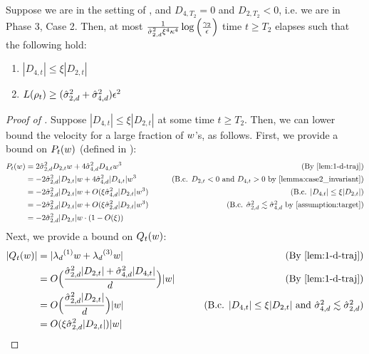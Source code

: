 \begin{lemma} \label{lemma:phase3_case2_d4_small_time}
Suppose we are in the setting of , and $D_{4, T_2} = 0$ and $D_{2, T_2} < 0$, i.e. we are in Phase 3, Case 2. Then, at most $\frac{1}{\hat{\sigma}_{2, d}^2 \xi^4 \kappa^4} \log\Big(\frac{\gamma_2}{\epsilon}\Big)$ time $t \geq T_2$ elapses such that the following hold:
\begin{enumerate}
    \item $|D_{4, t}| \leq \xi |D_{2, t}|$
    \item $L(\rho_t) \geq (\hat{\sigma}_{2, d}^2 + \hat{\sigma}_{4, d}^2) \epsilon^2$
\end{enumerate}
\end{lemma}
\begin{proof}[Proof of ]
Suppose $|D_{4, t}| \leq \xi |D_{2, t}|$ at some time $t \geq T_2$. Then, we can lower bound the velocity for a large fraction of $w$'s, as follows. First, we provide a bound on $P_t(w)$ (defined in ):
\begin{align}
P_t(\w)
& = 2 \sigmaCoeffTwo^2 D_{2, t} \w + 4 \sigmaCoeffFour^2 D_{4, t} \w^3 
& \tag{By \Cref{lem:1-d-traj}} \\
& = -2 \sigmaCoeffTwo^2 |D_{2, t}| \w + 4 \sigmaCoeffFour^2 |D_{4, t}| \w^3 
& \tag{B.c. $D_{2, t} < 0$ and $D_{4, t} > 0$ by \Cref{lemma:case2_invariant}} \\
& = -2 \sigmaCoeffTwo^2 |D_{2, t}| \w + O(\xi \sigmaCoeffFour^2 |D_{2, t}| \w^3) 
& \tag{B.c. $|D_{4, t}| \leq \xi |D_{2, t}|$} \\
& = -2 \sigmaCoeffTwo^2 |D_{2, t}| \w + O(\xi \sigmaCoeffTwo^2 |D_{2, t}| \w^3) 
& \tag{B.c. $\sigmaCoeffTwo^2 \lesssim \sigmaCoeffFour^2$ by \Cref{assumption:target}} \\
& = -2 \sigmaCoeffTwo^2 |D_{2, t}| \w \cdot (1 - O(\xi))
\end{align}
Next, we provide a bound on $Q_t(w)$:
\begin{align}
|Q_t(\w)|
& = |\lambdaD^{(1)} \w + \lambdaD^{(3)} \w|
& \tag{By \Cref{lem:1-d-traj}} \\
& = O\Big(\frac{\sigmaCoeffTwo^2 |D_{2, t}| + \sigmaCoeffFour^2 |D_{4, t}|}{d}\Big) |\w|
& \tag{By \Cref{lem:1-d-traj}} \\
& = O\Big(\frac{\sigmaCoeffTwo^2 |D_{2, t}|}{d}\Big) |\w| 
& \tag{B.c. $|D_{4, t}| \leq \xi |D_{2, t}|$ and $\sigmaCoeffFour^2 \lesssim \sigmaCoeffTwo^2$} \\
& = O(\xi \sigmaCoeffTwo^2 |D_{2, t}|) |\w| 

\end{align}
\end{proof}
